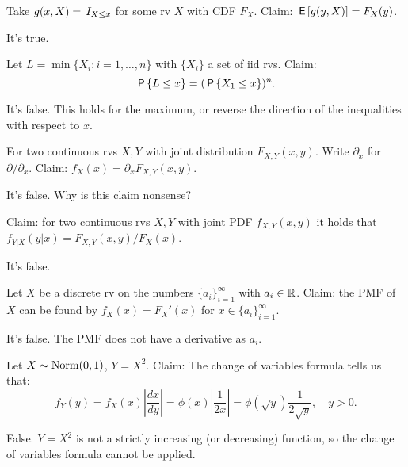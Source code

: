 \documentclass[tf-tutorial-all.tex]{subfiles}
\begin{document}
\begin{truefalse}
Take $g(x, X) = \1{X\leq x}$ for some rv $X$ with CDF $F_{X}$. Claim: $\E{g(y, X)} = F_{X}(y)$.
\begin{solution}
It's true.
\end{solution}
\end{truefalse}




\begin{truefalse}
Let $L = \min\{X_{i} : i =1, \ldots, n\}$ with $\{X_{i}\}$ a set of iid rvs.
Claim:
\begin{equation}
\P{L\leq x} = (\P{X_{1} \leq x})^{n}.
\end{equation}
\begin{solution}
It's false. This holds for the maximum, or reverse the direction of the inequalities with respect to $x$.
\end{solution}
\end{truefalse}

\begin{truefalse}
For two continuous rvs $X, Y$ with joint distribution $F_{X,Y}(x,y)$. Write $\partial_{x}$ for $\partial/ \partial_{x}$.
Claim: $f_{X}(x) = \partial_{x} F_{X,Y}(x,y)$.
\begin{solution}
It's false. Why is this claim nonsense?
\end{solution}
\end{truefalse}

\begin{truefalse}
Claim: for two continuous rvs $X, Y$ with joint PDF $f_{X,Y}(x,y)$ it holds that $f_{Y|X}(y|x) = F_{X,Y}(x,y)/F_{X}(x)$.
\begin{solution}
It's false.
\end{solution}
\end{truefalse}

\begin{truefalse}
Let $X$ be a discrete rv on the numbers $\{a_{i}\}_{i=1}^{\infty}$ with $a_{i} \in \R$.
Claim: the PMF of $X$ can be found by $f_{X}(x) = F_{X}'(x)$ for $x\in \{a_{i}\}_{i=1}^{\infty}$.
\begin{solution}
It's false. The PMF does not have a derivative as $a_{i}$.
\end{solution}
\end{truefalse}

\begin{truefalse}
    Let $X \sim \Norm{0,1}$, $Y=X^2$. Claim: The change of variables formula tells us that:
    $$f_Y(y)=f_X(x)\left|\frac{dx}{dy}\right|=\phi(x)\left|\frac{1}{2x}\right|=\phi(\sqrt{y})\frac{1}{2\sqrt{y}},\quad y>0.$$
    \begin{solution}
        False. $Y=X^2$ is not a strictly increasing (or decreasing) function, so the change of variables formula cannot be applied.
    \end{solution}
\end{truefalse}
\end{document}
